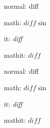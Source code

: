 \documentclass{article}
\begin{document}
normal: diff 

math: $diff \sin$

it: \textit{diff}

mathit: $\mathit{diff}$

\bfseries{}

normal: diff 

math: $diff \sin$

it: \textit{diff}

mathit: $\mathit{diff}$
\end{document}
